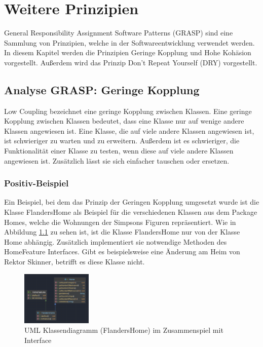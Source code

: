 \chapter{Weitere Prinzipien}
General Responsibility Assignment Software Patterns (GRASP) sind eine Sammlung von Prinzipien, welche in der Softwareentwicklung verwendet werden. In diesem Kapitel werden die Prinzipien Geringe Kopplung und Hohe Kohäsion vorgestellt. Außerdem wird das Prinzip Don't Repeat Yourself (DRY) vorgestellt.
\section{Analyse GRASP: Geringe Kopplung}
Low Coupling bezeichnet eine geringe Kopplung zwischen Klassen. Eine geringe Kopplung zwischen Klassen bedeutet, dass eine Klasse nur auf wenige andere Klassen angewiesen ist. Eine Klasse, die auf viele andere Klassen angewiesen ist, ist schwieriger zu warten und zu erweitern. Außerdem ist es schwieriger, die Funktionalität einer Klasse zu testen, wenn diese auf viele andere Klassen angewiesen ist. Zusätzlich lässt sie sich einfacher tauschen oder ersetzen. 
\newpage
\subsection{Positiv-Beispiel}
Ein Beispiel, bei dem das Prinzip der Geringen Kopplung umgesetzt wurde ist die Klasse FlandersHome als Beispiel für die verschiedenen Klassen aus dem Package Homes, welche die Wohnungen der Simpsons Figuren repräsentiert. Wie in Abbildung \ref{fig:flandersHome} zu sehen ist, ist die Klasse FlandersHome nur von der Klasse Home abhängig. Zusätzlich implementiert sie notwendige Methoden des HomeFeature Interfaces. Gibt es beispielsweise eine Änderung am Heim von Rektor Skinner, betrifft es diese Klasse nicht.  
\begin{figure}[ht]
    \centering
    \includegraphics[width=0.3\textwidth]{Bilder/homeI.png}
    \caption{UML Klassendiagramm (FlandersHome) im Zusammenspiel mit Interface}
    \label{fig:flandersHome}
\end{figure}

